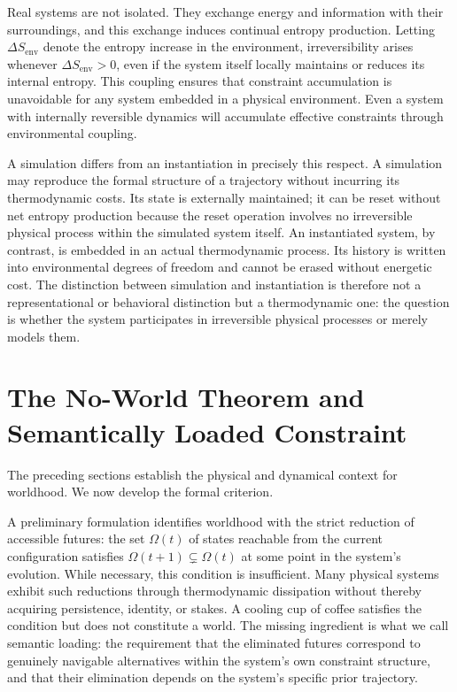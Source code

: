 \documentclass[11pt]{article}
\theoremstyle{definition}
\theoremstyle{remark}
\begin{document}
Real systems are not isolated. They exchange energy and information with their surroundings,
and this exchange induces continual entropy production. Letting $\Delta S_{\text{env}}$
denote the entropy increase in the environment, irreversibility arises whenever
$\Delta S_{\text{env}} > 0$, even if the system itself locally maintains or reduces its
internal entropy. This coupling ensures that constraint accumulation is unavoidable for any
system embedded in a physical environment. Even a system with internally reversible dynamics
will accumulate effective constraints through environmental coupling.

A simulation differs from an instantiation in precisely this respect. A simulation may
reproduce the formal structure of a trajectory without incurring its thermodynamic costs.
Its state is externally maintained; it can be reset without net entropy production because
the reset operation involves no irreversible physical process within the simulated system
itself. An instantiated system, by contrast, is embedded in an actual thermodynamic process.
Its history is written into environmental degrees of freedom and cannot be erased without
energetic cost. The distinction between simulation and instantiation is therefore not a
representational or behavioral distinction but a thermodynamic one: the question is whether
the system participates in irreversible physical processes or merely models them.

\section{The No-World Theorem and Semantically Loaded Constraint}

The preceding sections establish the physical and dynamical context for worldhood. We now
develop the formal criterion.

A preliminary formulation identifies worldhood with the strict reduction of accessible
futures: the set $\Omega(t)$ of states reachable from the current configuration satisfies
$\Omega(t+1) \subsetneq \Omega(t)$ at some point in the system's evolution. While necessary,
this condition is insufficient. Many physical systems exhibit such reductions through
thermodynamic dissipation without thereby acquiring persistence, identity, or stakes. A
cooling cup of coffee satisfies the condition but does not constitute a world. The missing
ingredient is what we call semantic loading: the requirement that the eliminated futures
correspond to genuinely navigable alternatives within the system's own constraint structure,
and that their elimination depends on the system's specific prior trajectory.
\end{document}
